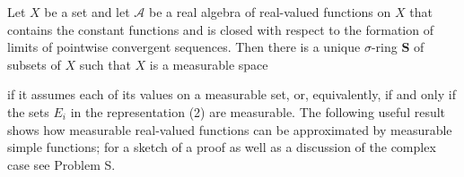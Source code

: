 Let $X$ be a set and let $\mathcal{A}$ be a real algebra of real-valued functions on $X$ that contains the constant functions and is closed with respect to the formation of limits of pointwise convergent sequences. Then there is a unique $\sigma$-ring $\mathbf{S}$ of subsets of $X$ such that $X$ is a measurable space

if it assumes each of its values on a measurable set, or, equivalently, if and only if the sets $E_i$ in the representation (2) are measurable. The following useful result shows how measurable real-valued functions can be approximated by measurable simple functions; for a sketch of a proof as well as a discussion of the complex case see Problem S.
